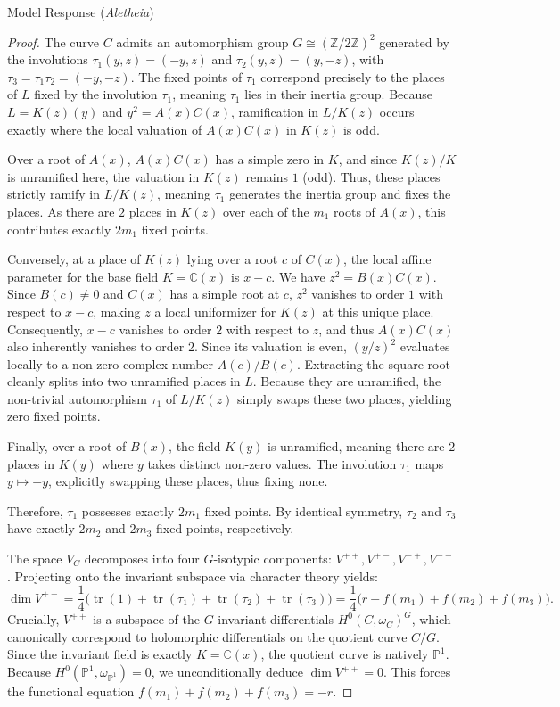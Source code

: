 \documentclass{article}
\theoremstyle{plain}
\theoremstyle{definition}
\newcommand{\Aletheia}{\emph{Aletheia}}
\begin{document}
\begin{solution}{Model Response (\Aletheia)}
\begin{proof}
The curve $C$ admits an automorphism group $G \cong (\mathbb{Z}/2\mathbb{Z})^2$ generated by the involutions $\tau_1(y, z) = (-y, z)$ and $\tau_2(y, z) = (y, -z)$, with $\tau_3 = \tau_1 \tau_2 = (-y, -z)$. The fixed points of $\tau_1$ correspond precisely to the places of $L$ fixed by the involution $\tau_1$, meaning $\tau_1$ lies in their inertia group. Because $L = K(z)(y)$ and $y^2 = A(x)C(x)$, ramification in $L/K(z)$ occurs exactly where the local valuation of $A(x)C(x)$ in $K(z)$ is odd.

Over a root of $A(x)$, $A(x)C(x)$ has a simple zero in $K$, and since $K(z)/K$ is unramified here, the valuation in $K(z)$ remains $1$ (odd). Thus, these places strictly ramify in $L/K(z)$, meaning $\tau_1$ generates the inertia group and fixes the places. As there are $2$ places in $K(z)$ over each of the $m_1$ roots of $A(x)$, this contributes exactly $2m_1$ fixed points.

Conversely, at a place of $K(z)$ lying over a root $c$ of $C(x)$, the local affine parameter for the base field $K = \mathbb{C}(x)$ is $x-c$. We have $z^2 = B(x)C(x)$. Since $B(c) \neq 0$ and $C(x)$ has a simple root at $c$, $z^2$ vanishes to order $1$ with respect to $x-c$, making $z$ a local uniformizer for $K(z)$ at this unique place. Consequently, $x-c$ vanishes to order $2$ with respect to $z$, and thus $A(x)C(x)$ also inherently vanishes to order $2$. Since its valuation is even, $(y/z)^2$ evaluates locally to a non-zero complex number $A(c)/B(c)$. Extracting the square root cleanly splits into two unramified places in $L$. Because they are unramified, the non-trivial automorphism $\tau_1$ of $L/K(z)$ simply swaps these two places, yielding zero fixed points.

Finally, over a root of $B(x)$, the field $K(y)$ is unramified, meaning there are $2$ places in $K(y)$ where $y$ takes distinct non-zero values. The involution $\tau_1$ maps $y \mapsto -y$, explicitly swapping these places, thus fixing none.

Therefore, $\tau_1$ possesses exactly $2m_1$ fixed points. By identical symmetry, $\tau_2$ and $\tau_3$ have exactly $2m_2$ and $2m_3$ fixed points, respectively.

The space $V_C$ decomposes into four $G$-isotypic components: $V^{++}, V^{+-}, V^{-+}, V^{--}$. Projecting onto the invariant subspace via character theory yields:
\[ \dim V^{++} = \frac{1}{4} \big( \operatorname{tr}(1) + \operatorname{tr}(\tau_1) + \operatorname{tr}(\tau_2) + \operatorname{tr}(\tau_3) \big) = \frac{1}{4} \big( r + f(m_1) + f(m_2) + f(m_3) \big). \]
Crucially, $V^{++}$ is a subspace of the $G$-invariant differentials $H^0(C, \omega_C)^G$, which canonically correspond to holomorphic differentials on the quotient curve $C/G$. Since the invariant field is exactly $K = \mathbb{C}(x)$, the quotient curve is natively $\mathbb{P}^1$. Because $H^0(\mathbb{P}^1, \omega_{\mathbb{P}^1}) = 0$, we unconditionally deduce $\dim V^{++} = 0$. This forces the functional equation $f(m_1) + f(m_2) + f(m_3) = -r$.
\end{proof}


\end{solution}
\end{document}
